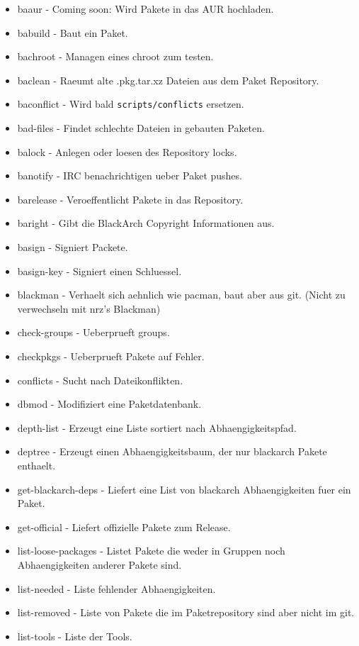\documentclass[a4paper, oneside, 11pt]{book}
\begin{document}
\begin{itemize}
\item baaur - Coming soon: Wird Pakete in das AUR hochladen.
\item babuild - Baut ein Paket.
\item bachroot - Managen eines chroot zum testen.
\item baclean - Raeumt alte .pkg.tar.xz Dateien aus dem Paket Repository.
\item baconflict - Wird bald \verb|scripts/conflicts| ersetzen.
\item bad-files - Findet schlechte Dateien in gebauten Paketen.
\item balock - Anlegen oder loesen des Repository locks.
\item banotify - IRC benachrichtigen ueber Paket pushes.
\item barelease - Veroeffentlicht Pakete in das Repository.
\item baright - Gibt die BlackArch Copyright Informationen aus.
\item basign - Signiert Packete.
\item basign-key - Signiert einen Schluessel.
\item blackman - Verhaelt sich aehnlich wie pacman, baut aber aus git. 
	(Nicht zu verwechseln mit nrz's Blackman)
\item check-groups - Ueberprueft groups.
\item checkpkgs - Ueberprueft Pakete auf Fehler.
\item conflicts - Sucht nach Dateikonflikten.
\item dbmod - Modifiziert eine Paketdatenbank.
\item depth-list - Erzeugt eine Liste sortiert nach Abhaengigkeitspfad.
\item deptree - Erzeugt einen Abhaengigkeitsbaum, der nur blackarch Pakete enthaelt.
\item get-blackarch-deps - Liefert eine List von blackarch Abhaengigkeiten fuer ein Paket.
\item get-official - Liefert offizielle Pakete zum Release.
\item list-loose-packages - Listet Pakete die weder in Gruppen noch Abhaengigkeiten anderer Pakete sind.
\item list-needed - Liste fehlender Abhaengigkeiten.
\item list-removed - Liste von Pakete die im Paketrepository sind aber nicht im git.
\item list-tools - Liste der Tools.

\end{itemize}
\end{document}
